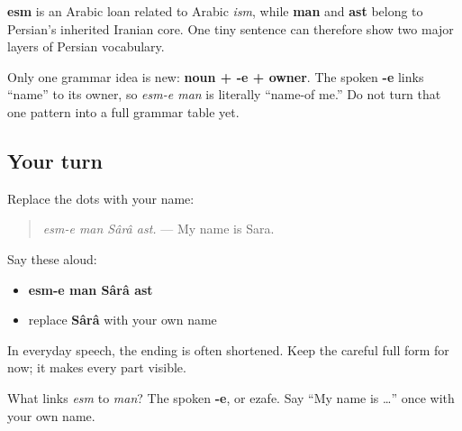 \begin{cousinweb}
\textbf{esm} is an Arabic loan related to Arabic \emph{ism}, while \textbf{man} and \textbf{ast} belong to Persian's inherited Iranian core. One tiny sentence can therefore show two major layers of Persian vocabulary.
\end{cousinweb}

\begin{grammarlens}[title={Grammar Lens: one spoken link}]
Only one grammar idea is new: \textbf{noun + -e + owner}. The spoken \textbf{-e} links “name” to its owner, so \emph{esm-e man} is literally “name-of me.” Do not turn that one pattern into a full grammar table yet.
\end{grammarlens}

\subsection*{Your turn}
Replace the dots with your name:

\begin{quote}
\emph{esm-e man Sârâ ast.} — My name is Sara.
\end{quote}

Say these aloud:

\begin{itemize}
\raggedright
  \item \textbf{esm-e man Sârâ ast}
  \item replace \textbf{Sârâ} with your own name
\end{itemize}

In everyday speech, the ending is often shortened. Keep the careful full form for now; it makes every part visible.

\begin{tcolorbox}[breakable,colback=teal!4,colframe=teal!35!black,title={Before you move on}]
What links \emph{esm} to \emph{man}? The spoken \textbf{-e}, or ezafe. Say “My name is …” once with your own name.
\end{tcolorbox}
